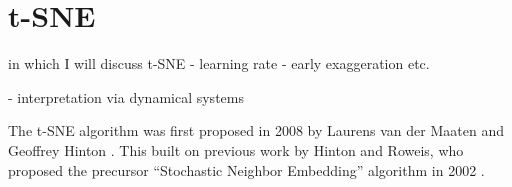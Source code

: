 \chapter{t-SNE}\label{chapter:t-sne}

in which I will discuss t-SNE
- learning rate 
- early exaggeration 
etc. 

- interpretation via dynamical systems

The t-SNE algorithm was first proposed in 2008 by Laurens van der Maaten and Geoffrey Hinton \cite{vdMaa08}. 
This built on previous work by Hinton and Roweis, who proposed the precursor \enquote{Stochastic Neighbor Embedding} algorithm in 2002 \cite{Hinton02}. 



